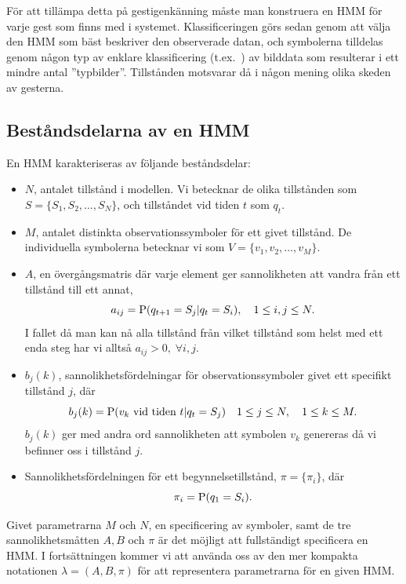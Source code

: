 \documentclass[../rapport_MVEX01-11-05]{subfiles}
\begin{document}
För att tillämpa detta på gestigenkänning måste man konstruera en HMM
för varje gest som finns med i systemet. Klassificeringen görs sedan genom
att välja den HMM som bäst beskriver den observerade datan, och symbolerna
tilldelas genom någon typ av enklare klassificering (t.ex.~\knn) av bilddata
som resulterar i ett mindre antal ''typbilder''. Tillstånden motsvarar
då i någon mening olika skeden av gesterna.


\subsection{Beståndsdelarna av en HMM}
En HMM karakteriseras av följande beståndsdelar:
\begin{itemize}
\item $N$, antalet tillstånd i modellen. Vi betecknar de olika
  tillstånden som $S = \{S_1, S_2, \dots, S_N\}$, och tillståndet vid
  tiden $t$ som $q_t$.
\item $M$, antalet distinkta observationssymboler för ett givet
  tillstånd. De individuella symbolerna betecknar vi som $V =
  \{v_1,v_2,\dots,v_M\}$.
\item $A$, en övergångsmatris där varje element ger sannolikheten att
  vandra från ett tillstånd till ett annat, 
\begin{equation*}
a_{ij} = \mathrm{P}(q_{t+1} = S_j|q_t = S_i),\quad 1 \leq i,j \leq N.
\end{equation*}
I fallet då man kan nå alla tillstånd från vilket tillstånd som helst
med ett enda steg har vi alltså $a_{ij} > 0,\;\forall i,j$. 
\item $b_j(k)$, sannolikhetsfördelningar för observationssymboler givet ett
  specifikt tillstånd $j$, där 
\begin{equation*}
b_j(k) = \mathrm{P}(v_k \text{ vid tiden } t|q_t = S_j) \quad 1 \leq j \leq N,\quad1 \leq k \leq M.
\end{equation*}
$b_j(k)$ ger med andra ord sannolikheten att symbolen $v_k$ genereras
då vi befinner oss i tillstånd $j$.
\item Sannolikhetsfördelningen för ett begynnelsetillstånd, $\pi =
  \{\pi_i\}$, där
\begin{equation*}
\pi_i = \mathrm{P}(q_1 = S_i).
\end{equation*}
\end{itemize}
Givet parametrarna $M$ och $N$, en specificering av symboler, samt de
tre sannolikhetsmåtten $A, B$ och $\pi$ är det möjligt att
fullständigt specificera en HMM. I fortsättningen kommer vi att
använda oss av den mer kompakta notationen $\lambda = (A,B,\pi)$
för att representera parametrarna för en given HMM.
\end{document}
